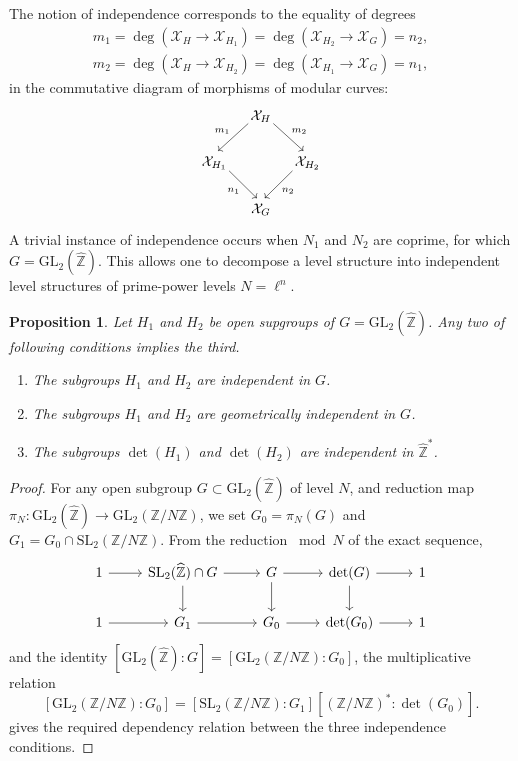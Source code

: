 \documentclass{amsart}
\newcommand{\cX}{\mathcal{X}}
\newcommand{\ZZ}{\mathbb{Z}}
\newcommand{\ZZhat}{\widehat{\ZZ}}
\newcommand{\GL}{\mathrm{GL}}
\newcommand{\SL}{\mathrm{SL}}
\newtheorem{proposition}[theorem]{Proposition}
\begin{document}
\noindent
The notion of independence corresponds to the equality of degrees
$$
\begin{array}{c}
m_1 = \deg\left(\cX_H\to\cX_{H_1}\right) = \deg\left(\cX_{H_2}\to\cX_G\right) = n_2,\\[2mm]
m_2 = \deg\left(\cX_H\to\cX_{H_2}\right) = \deg\left(\cX_{H_1}\to\cX_G\right) = n_1,
\end{array}
$$
in the commutative diagram of morphisms of modular curves:
$$
\begin{tikzcd}[column sep=3mm,row sep=6mm]
  & \cX_H
  \arrow[dl,"m_1",swap,start anchor={[xshift=+1mm,yshift=+1mm]south west}, end anchor={[xshift=+1mm]north}]
  \arrow[dr,"m_2",start anchor={[xshift=-1mm,yshift=+1mm]south east}, end anchor={[xshift=-1mm]north}] \\
  \cX_{H_1}
  \arrow[dr,"n_1",swap,start anchor={[xshift=-1mm,yshift=+1mm]south east}, end anchor={[xshift=-1mm]north}]
  & & \cX_{H_2}
  \arrow[dl,"n_2",start anchor={[xshift=+1mm,yshift=+1mm]south west}, end anchor={[xshift=+1mm]north}] \\
  & \cX_G
\end{tikzcd}
$$
A trivial instance of independence occurs when $N_1$ and $N_2$ are coprime, for which
$G = \GL_2(\ZZhat)$.  This allows one to decompose a level structure into independent
level structures of prime-power levels $N = \ell^n$.

\begin{proposition}
  Let $H_1$ and $H_2$ be open supgroups of $G = \GL_2(\ZZhat)$. Any two of following
  conditions implies the third.
  \begin{enumerate} %
    \item The subgroups $H_1$ and $H_2$ are independent in $G$.
    \item The subgroups $H_1$ and $H_2$ are geometrically independent in $G$.
    \item The subgroups $\det(H_1)$ and $\det(H_2)$ are independent in $\ZZhat^*$.
  \end{enumerate} %
\end{proposition}

\begin{proof}
  For any open subgroup $G \subset \GL_2(\ZZhat)$ of level $N$,
  and reduction map $\pi_N: \GL_2(\ZZhat) \to \GL_2(\ZZ/N\ZZ)$,
  we set $G_0 = \pi_N(G)$ and $G_1 = G_0 \cap \SL_2(\ZZ/N\ZZ)$.
  From the reduction $\bmod N$ of the exact sequence,
  $$
  \begin{tikzcd}
    1 \arrow[r] &
    \SL_2(\ZZhat) \cap G \arrow[r] \arrow[d] &
    G \arrow[r] \arrow[d] &
    \det(G) \arrow[r] \arrow[d] & 1 \\
    1 \arrow[r] & G_1 \arrow[r] & G_0 \arrow[r] & \det(G_0) \arrow[r] & 1
  \end{tikzcd}
  $$
  and the identity $[\GL_2(\ZZhat):G] = [\GL_2(\ZZ/N\ZZ):G_0]$, the
  multiplicative relation
  $$
  [\GL_2(\ZZ/N\ZZ):G_0] = [\SL_2(\ZZ/N\ZZ):G_1][(\ZZ/N\ZZ)^*:\det(G_0)].
  $$
  gives the required dependency relation between the three independence conditions.
\end{proof}
\end{document}
